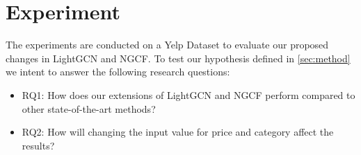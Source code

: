 \section{Experiment}
The experiments are conducted on a Yelp Dataset to evaluate our proposed changes in LightGCN and NGCF.
To test our hypothesis defined in \autoref{sec:method} we intent to answer the following research questions:
\begin{itemize}
    \item RQ1: How does our extensions of LightGCN and NGCF perform compared to other state-of-the-art methods?
    \item RQ2: How will changing the input value for price and category affect the results?
\end{itemize}




